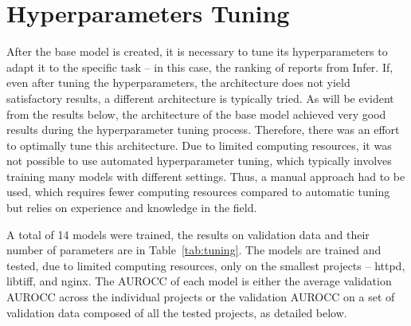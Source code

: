 \section{Hyperparameters Tuning}
\label{hyperparameter-tuning}
After the base model is created, it is necessary to tune its hyperparameters to adapt it to the specific task -- in this case, the ranking of reports from Infer. If, even after tuning the hyperparameters, the architecture does not yield satisfactory results, a different architecture is typically tried. As will be evident from the results below, the architecture of the base model achieved very good results during the hyperparameter tuning process. Therefore, there was an effort to optimally tune this architecture. Due to limited computing resources, it was not possible to use automated hyperparameter tuning, which typically involves training many models with different settings. Thus, a manual approach had to be used, which requires fewer computing resources compared to automatic tuning but relies on experience and knowledge in the field.

A total of 14 models were trained, the results on validation data and their number of parameters are in Table~\ref{tab:tuning}. The models are trained and tested, due to limited computing resources, only on the smallest projects -- httpd, libtiff, and nginx. The AUROCC of each model is either the average validation AUROCC across the individual projects or the validation AUROCC on a set of validation data composed of all the tested projects, as detailed below.

